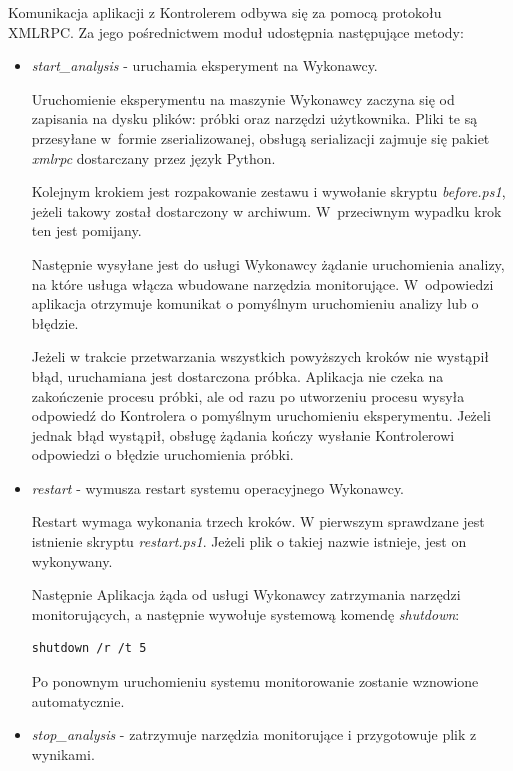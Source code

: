 \documentclass[a4paper,12pt,oneside]{article}
\begin{document}
	Komunikacja aplikacji z Kontrolerem odbywa się za pomocą protokołu XMLRPC. Za jego pośrednictwem moduł udostępnia następujące metody:
	\begin{itemize}
		\item \textit{start\_analysis} - uruchamia eksperyment na Wykonawcy.
		
		Uruchomienie eksperymentu na maszynie Wykonawcy zaczyna się od zapisania na dysku plików: próbki oraz narzędzi użytkownika. Pliki te są przesyłane w~formie zserializowanej, obsługą serializacji zajmuje się pakiet \textit{xmlrpc} dostarczany przez język Python. 
		 
		Kolejnym krokiem jest rozpakowanie zestawu i wywołanie skryptu \textit{before.ps1}, jeżeli takowy został dostarczony w archiwum. W~przeciwnym wypadku krok ten jest pomijany.
		 
		Następnie wysyłane jest do usługi Wykonawcy żądanie uruchomienia analizy, na które usługa włącza wbudowane narzędzia monitorujące. W~odpowiedzi aplikacja otrzymuje komunikat o pomyślnym uruchomieniu analizy lub o błędzie.
		 
		Jeżeli w trakcie przetwarzania wszystkich powyższych kroków nie wystąpił błąd, uruchamiana jest dostarczona próbka. Aplikacja nie czeka na zakończenie procesu próbki, ale od razu po utworzeniu procesu wysyła odpowiedź do Kontrolera o pomyślnym uruchomieniu eksperymentu. Jeżeli jednak błąd wystąpił, obsługę żądania kończy wysłanie Kontrolerowi odpowiedzi o błędzie uruchomienia próbki.
		
		\item \textit{restart} - wymusza restart systemu operacyjnego Wykonawcy.
		
		Restart wymaga wykonania trzech kroków. W pierwszym sprawdzane jest istnienie skryptu \textit{restart.ps1}. Jeżeli plik o takiej nazwie istnieje, jest on wykonywany.
		
		Następnie Aplikacja żąda od usługi Wykonawcy zatrzymania narzędzi monitorujących, a następnie wywołuje systemową komendę \textit{shutdown}:
		
		\begin{lstlisting}
shutdown /r /t 5
		\end{lstlisting}
		
		Po ponownym uruchomieniu systemu monitorowanie zostanie wznowione automatycznie.
		 
		\item \textit{stop\_analysis} - zatrzymuje narzędzia monitorujące i przygotowuje plik z wynikami.
		

\end{itemize}
\end{document}
